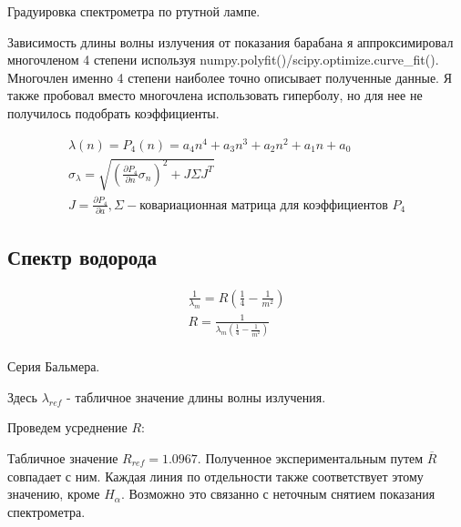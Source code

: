 \documentclass[12pt]{article}
\begin{document}
\begin{table}[H]
\begin{center}
\caption{Градуировка спектрометра по ртутной лампе.}

\end{center}
\end{table}

Зависимость длины волны излучения от показания барабана я аппроксимировал многочленом 4 степени используя numpy.polyfit()/scipy.optimize.curve\_fit().
Многочлен именно 4 степени наиболее точно описывает полученные данные.
Я также пробовал вместо многочлена использовать гиперболу, но для нее не получилось подобрать коэффициенты.

\begin{figure}[h!]
    \centering
    
\end{figure}

\begin{gather*}
    \lambda(n) = P_4(n) = a_4 n^4 + a_3 n^3 + a_2 n^2 + a_1 n + a_0 \\
    \sigma_\lambda = \sqrt{\left( \frac{\partial P_4}{\partial n} \sigma_n \right)^2 + J \Sigma J^T } \\
    J = \frac{\partial P_4}{\partial a}, \Sigma - \text{ковариационная матрица для коэффициентов $P_4$}
\end{gather*}

\subsection{Спектр водорода}
\begin{gather*}
    \frac{1}{\lambda_m} = R \left( \frac{1}{4} - \frac{1}{m^2} \right) \\
    R = \frac{1}{\lambda_m \left( \frac{1}{4} - \frac{1}{m^2} \right)} \\
\end{gather*}

\begin{table}[H]
\begin{center}
\caption{Серия Бальмера.}

\end{center}
\end{table}

Здесь $\lambda_{ref}$ - табличное значение длины волны излучения.

Проведем усреднение $R$:

Табличное значение $R_{ref} = 1.0967$. Полученное экспериментальным путем $\overline{R}$ совпадает с ним.
Каждая линия по отдельности также соответствует этому значению, кроме $H_\alpha$.
Возможно это связанно с неточным снятием показания спектрометра.
\end{document}
